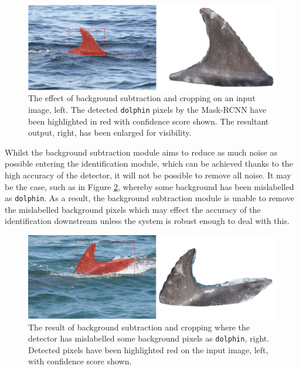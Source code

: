 \begin{figure}[h]
	\begin{center}
		\includegraphics[scale=0.5]{Chapter4/figs/fin-extraction-clean.png}
	\end{center}
	\caption{The effect of background subtraction and cropping on an input image, left. The detected \texttt{dolphin} pixels by the Mask-RCNN have been highlighted in red with confidence score shown. The resultant output, right, has been enlarged for visibility.}
	\label{fig:fin-extraction-clean}
\end{figure}

Whilst the background subtraction module aims to reduce as much noise as possible entering the identification module, which can be achieved thanks to the high accuracy of the detector, it will not be possible to remove all noise. It may be the case, such as in Figure \ref{fig:fin-extraction-unclean}, whereby some background has been mislabelled as \texttt{dolphin}. As a result, the background subtraction module is unable to remove the mislabelled background pixels which may effect the accuracy of the identification downstream unless the system is robust enough to deal with this.

\begin{figure}[h]
	\begin{center}
		\includegraphics[scale=0.5]{Chapter4/figs/fin-extraction-unclean.png}
	\end{center}
	\caption{The result of background subtraction and cropping where the detector has mislabelled some background pixels as \texttt{dolphin}, right. Detected pixels have been highlighted red on the input image, left, with confidence score shown.}
	\label{fig:fin-extraction-unclean}
\end{figure}


